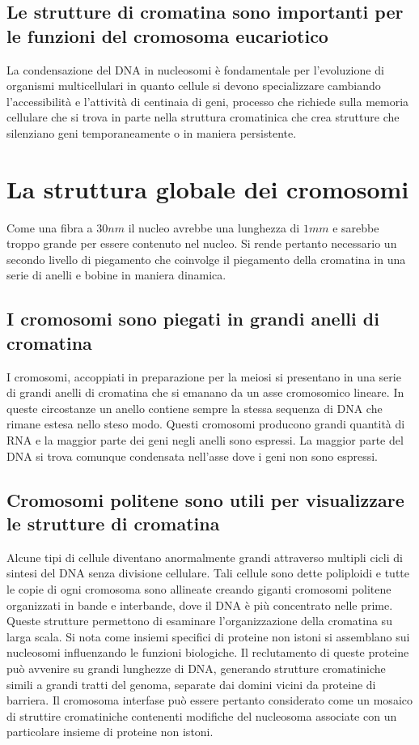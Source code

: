 \subsection{Le strutture di cromatina sono importanti per le funzioni del cromosoma eucariotico}
La condensazione del DNA in nucleosomi \`e fondamentale per l'evoluzione di organismi multicellulari in quanto cellule si devono specializzare cambiando l'accessibilit\`a e l'attivit\`a
di centinaia di geni, processo che richiede sulla memoria cellulare che si trova in parte nella struttura cromatinica che crea strutture che silenziano geni temporaneamente o in 
maniera persistente.
\section{La struttura globale dei cromosomi}
Come una fibra a $30nm$ il nucleo avrebbe una lunghezza di $1mm$ e sarebbe troppo grande per essere contenuto nel nucleo. Si rende pertanto necessario un secondo livello di piegamento
che coinvolge il piegamento della cromatina in una serie di anelli e bobine in maniera dinamica.
\subsection{I cromosomi sono piegati in grandi anelli di cromatina}
I cromosomi, accoppiati in preparazione per la meiosi si presentano in una serie di grandi anelli di cromatina che si emanano da un asse cromosomico lineare. In queste circostanze un
anello contiene sempre la stessa sequenza di DNA che rimane estesa nello steso modo. Questi cromosomi producono grandi quantit\`a di RNA e la maggior parte dei geni negli anelli sono
espressi. La maggior parte del DNA si trova comunque condensata nell'asse dove i geni non sono espressi. 
\subsection{Cromosomi politene sono utili per visualizzare le strutture di cromatina}
Alcune tipi di cellule diventano anormalmente grandi attraverso multipli cicli di sintesi del DNA senza divisione cellulare. Tali cellule sono dette poliploidi e tutte le copie di ogni 
cromosoma sono allineate creando giganti cromosomi politene organizzati in bande e interbande, dove il DNA \`e pi\`u concentrato nelle prime. Queste strutture permettono di esaminare 
l'organizzazione della cromatina su larga scala. Si nota come insiemi specifici di proteine non istoni si assemblano sui nucleosomi influenzando le funzioni biologiche. Il reclutamento
di queste proteine pu\`o avvenire su grandi lunghezze di DNA, generando strutture cromatiniche simili a grandi tratti del genoma, separate dai domini vicini da proteine di barriera. Il
cromosoma interfase pu\`o essere pertanto considerato come un mosaico di struttire cromatiniche contenenti modifiche del nucleosoma associate con un particolare insieme di proteine non
istoni. 
